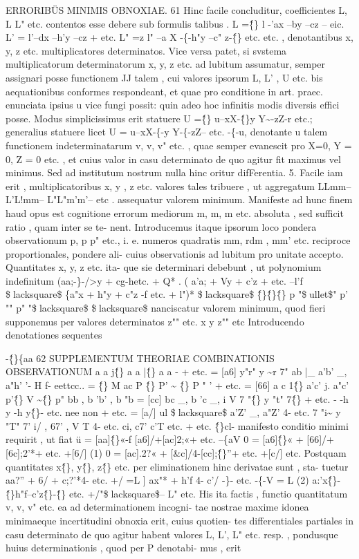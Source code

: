 \documentclass[12pt,a4paper]{article}
\begin{document}
\newpage
ERRORIBÜS MINIMIS OBNOXIAE. 61
Hinc facile concluditur, coefficientes L, L L" etc. contentos esse debere sub
formulis talibus
. L =\^\{\} l -'ax --by --cz -- eic.
L' = l'--dx --h'y --cz + etc.
L" =z l" --a X -\{-h"y --c" z-\^\{\} etc.
etc. , denotantibus x, y, z etc. multiplicatores determinatos. Vice versa patet,
si svstema multiplicatorum determinatorum x, y, z etc. ad lubitum assumatur,
semper assignari posse functionem JJ talem , cui valores ipsorum L, L' , U etc.
bis aequationibus conformes respondeant, et quae pro conditione in art. praec.
enunciata ipsius u vice fungi possit: quin adeo hoc infinitis modis diversis effici
posse. Modus simplicissimus erit statuere U =\^\{\} u--xX-\^\{\}y Y\~{}-zZ-r etc.;
generalius statuere licet U = u--xX-\{-y Y-\{-zZ-- etc. -\{-u, denotante u
talem functionem indeterminatarum v, v, v" etc. , quae semper evanescit pro
X=0, Y = 0, Z = 0 etc. , et cuius valor in casu determinato de quo agitur
fit maximus vel minimus. Sed ad institutum nostrum nulla hinc oritur difFerentia.
5.
Facile iam erit , multiplicatoribus x, y , z etc. valores tales tribuere , ut
aggregatum
LLmm-- L'L!mm-- L"L"m'm'-- etc .
assequatur valorem minimum. Manifeste ad hunc finem haud opus est cognitione
errorum mediorum m, m, m etc. absoluta , sed sufficit ratio , quam inter se te-
nent. Introducemus itaque ipsorum loco pondera observationum p, p p" etc.,
i. e. numeros quadratis mm, rdm , mm' etc. reciproce proportionales, pondere ali-
cuius observationis ad lubitum pro unitate accepto. Quantitates x, y, z etc. ita-
que sie determinari debebunt , ut polynomium indefinitum
(aa;-\}-/>y + cg-hetc. + Q* . ( a'a; + Vy + c'z + etc. --l'f \$lacksquare\$ \{a"x + h"y + c"z -f etc. + l")* \$lacksquare\$ \^\{\}\^\{\}\^\{\}
p "\$ullet\$" p' "" p" "\$lacksquare\$ \$lacksquare\$
nanciscatur valorem minimum, quod fieri supponemus per valores determinatos
z"" etc.
x y z"" etc
Introducendo denotationes sequentes

\newpage
-\^\{\}\{aa
62 SUPPLEMENTUM THEORIAE COMBINATIONIS OBSERVATIONUM
a a j\^\{\} a a |\^\{\} a a - + etc. = [a6]
y"r" y \~{}r 7"
ab |\_ a'b' \_, a"h' '- H f- eettcc.. = \^\{\}  M ac
P \^\{\} P' \~{} \^\{\} P " ' + etc. = [66]
a c 1\^\{\} a'c' j. a"c'
p'\^\{\} V \~{}\^\{\} p"
bb , b 'b' , b "b
= [cc]
bc \_, b 'c \_, i V
7 "\^\{\} y "t" 7\^\{\}
+ etc.
- -h y -h y\^\{\}-
etc. nee non + etc. = [a/]
ul \$lacksquare\$ a'Z' \_, a"Z' 4- etc.
7 "i\~{} y "T" 7'
i/ , 67' , V T
4- etc.
ci, c7' c'T
etc. + etc.
\^\{\}cl-
manifesto conditio minimi requirit , ut fiat
ü = [aa]\^\{\}«-f [a6]/+[ac]2;«+ etc. --\{aV 
0 = [a6]\^\{\}« + [66]/+[6c];2'*+ etc. +[6/] (1)
0 = [ac].2?« + [\&c]/4-[cc];\^\{\}''+ etc. +[c/]
etc.
Postquam quantitates x\^\{\}, y\^\{\}, z\^\{\} etc. per eliminationem hinc derivatae sunt , sta-
tuetur
aa?'' + 6/ + c;?'*4- etc. +/ =L ]
ax"* + h'f 4- c'/ -\}- etc. -\{-V = L
(2)
a:'x\^\{\}-\^\{\}h"f--c'z\^\{\}-\^\{\} etc. +/"\$lacksquare\$-- L"
etc.
His ita factis , functio quantitatum v, v, v" etc. ea ad determinationem incogni-
tae nostrae maxime idonea minimaeque incertitudini obnoxia erit, cuius quotien-
tes differentiales partiales in casu determinato de quo agitur habent valores
L, L', L" etc. resp. , pondusque huius determinationis , quod per P denotabi-
mus , erit
\end{document}
